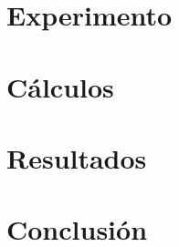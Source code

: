 \documentclass[5p,times,authoryear]{elsarticle}
\begin{document}


 
 

\section{Experimento}



\section{C\'alculos}


\section{Resultados}

 

\section{Conclusi\'on}

 
 
\end{document}
